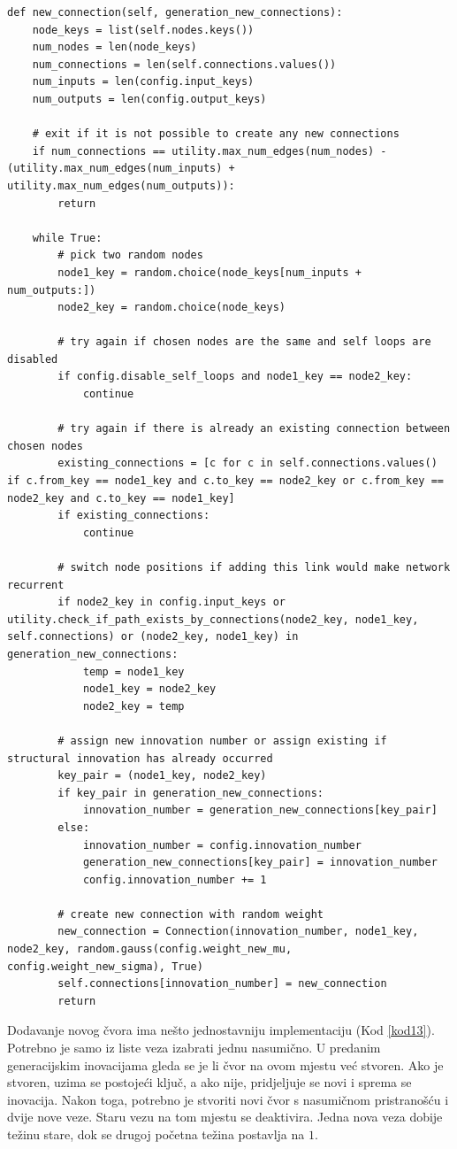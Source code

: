\documentclass[times, utf8, diplomski, numeric]{fer}
\begin{document}
\begin{lstlisting}[frame=single, label=kod12, caption=Izvorni tekst metode \textit{new\_connection} u klasi \textit{Individual}]
def new_connection(self, generation_new_connections):
	node_keys = list(self.nodes.keys())
	num_nodes = len(node_keys)
	num_connections = len(self.connections.values())
	num_inputs = len(config.input_keys)
	num_outputs = len(config.output_keys)

	# exit if it is not possible to create any new connections
	if num_connections == utility.max_num_edges(num_nodes) - (utility.max_num_edges(num_inputs) + utility.max_num_edges(num_outputs)):
		return

	while True:
		# pick two random nodes
		node1_key = random.choice(node_keys[num_inputs + num_outputs:])
		node2_key = random.choice(node_keys)

		# try again if chosen nodes are the same and self loops are disabled
		if config.disable_self_loops and node1_key == node2_key:
			continue

		# try again if there is already an existing connection between chosen nodes
		existing_connections = [c for c in self.connections.values() if c.from_key == node1_key and c.to_key == node2_key or c.from_key == node2_key and c.to_key == node1_key]
		if existing_connections:
			continue

		# switch node positions if adding this link would make network recurrent
		if node2_key in config.input_keys or utility.check_if_path_exists_by_connections(node2_key, node1_key, self.connections) or (node2_key, node1_key) in generation_new_connections:
			temp = node1_key
			node1_key = node2_key
			node2_key = temp

		# assign new innovation number or assign existing if structural innovation has already occurred
		key_pair = (node1_key, node2_key)
		if key_pair in generation_new_connections:
			innovation_number = generation_new_connections[key_pair]
		else:
			innovation_number = config.innovation_number
			generation_new_connections[key_pair] = innovation_number
			config.innovation_number += 1

		# create new connection with random weight
		new_connection = Connection(innovation_number, node1_key, node2_key, random.gauss(config.weight_new_mu, config.weight_new_sigma), True)
		self.connections[innovation_number] = new_connection
		return
\end{lstlisting}

Dodavanje novog čvora ima nešto jednostavniju implementaciju (Kod \ref{kod13}). Potrebno je samo iz liste veza izabrati jednu nasumično. U predanim generacijskim inovacijama gleda se je li čvor na ovom mjestu već stvoren. Ako je stvoren, uzima se postojeći ključ, a ako nije, pridjeljuje se novi i sprema se inovacija. Nakon toga, potrebno je stvoriti novi čvor s nasumičnom pristranošću i dvije nove veze. Staru vezu na tom mjestu se deaktivira. Jedna nova veza dobije težinu stare, dok se drugoj početna težina postavlja na $1$.
\end{document}
